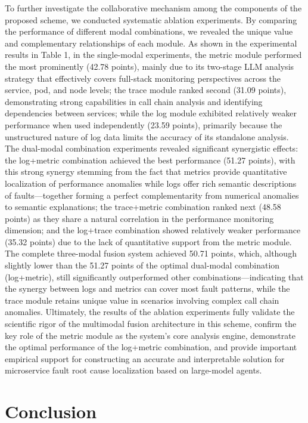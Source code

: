 \documentclass[10pt]{article}
\begin{document}
To further investigate the collaborative mechanism among the components of the proposed scheme, we conducted systematic ablation experiments. By comparing the performance of different modal combinations, we revealed the unique value and complementary relationships of each module. As shown in the experimental results in Table 1, in the single-modal experiments, the metric module performed the most prominently (42.78 points), mainly due to its two-stage LLM analysis strategy that effectively covers full-stack monitoring perspectives across the service, pod, and node levels; the trace module ranked second (31.09 points), demonstrating strong capabilities in call chain analysis and identifying dependencies between services; while the log module exhibited relatively weaker performance when used independently (23.59 points), primarily because the unstructured nature of log data limits the accuracy of its standalone analysis. The dual-modal combination experiments revealed significant synergistic effects: the log+metric combination achieved the best performance (51.27 points), with this strong synergy stemming from the fact that metrics provide quantitative localization of performance anomalies while logs offer rich semantic descriptions of faults—together forming a perfect complementarity from numerical anomalies to semantic explanations; the trace+metric combination ranked next (48.58 points) as they share a natural correlation in the performance monitoring dimension; and the log+trace combination showed relatively weaker performance (35.32 points) due to the lack of quantitative support from the metric module. The complete three-modal fusion system achieved 50.71 points, which, although slightly lower than the 51.27 points of the optimal dual-modal combination (log+metric), still significantly outperformed other combinations—indicating that the synergy between logs and metrics can cover most fault patterns, while the trace module retains unique value in scenarios involving complex call chain anomalies. Ultimately, the results of the ablation experiments fully validate the scientific rigor of the multimodal fusion architecture in this scheme, confirm the key role of the metric module as the system’s core analysis engine, demonstrate the optimal performance of the log+metric combination, and provide important empirical support for constructing an accurate and interpretable solution for microservice fault root cause localization based on large-model agents.

\section{Conclusion}
\end{document}
